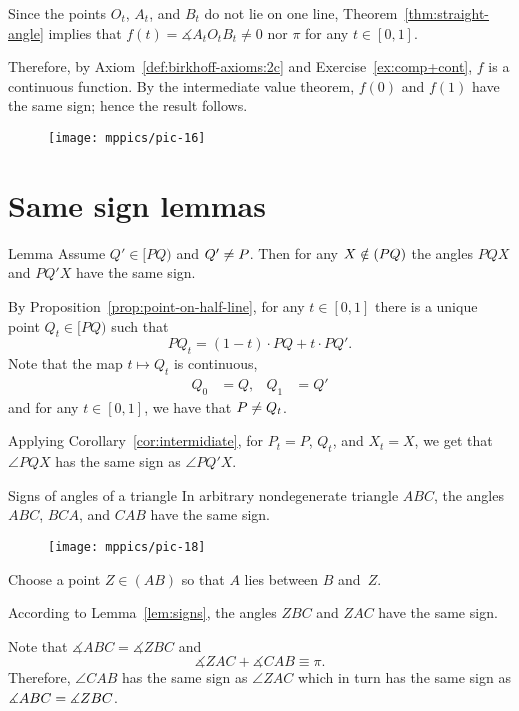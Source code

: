 Since 
the points $O_t$, $A_t$, and $B_t$ do not lie on one line,
Theorem~\ref{thm:straight-angle} implies that $f(t)=\measuredangle A_tO_tB_t\ne 0$ nor $\pi$ for any $t\in[0,1]$.

Therefore, by Axiom~\ref{def:birkhoff-axioms:2c} and Exercise~\ref{ex:comp+cont},
$f$ is a continuous function.
By the intermediate value theorem, $f(0)$ and $f(1)$ have the same sign;
hence the result follows.
\qeds

{

\begin{wrapfigure}{r}{33mm}
\centering
\texttt{[image: mppics/pic-16]}
\end{wrapfigure}

\section*{Same sign lemmas}

\begin{thm}[\abs]{Lemma}\label{lem:signs}
Assume $Q'\in [PQ)$ and $Q'\z\ne P$.
Then for any $X\z\notin (PQ)$ the angles $PQX$ and $PQ'X$ have the same sign. 
\end{thm}

By Proposition~\ref{prop:point-on-half-line},
for any $t\in [0,1]$ there is a unique point $Q_t\in[PQ)$ 
such that 
\[PQ_t=  (1-t)\cdot PQ+t\cdot PQ'.\]
Note that the map $t\mapsto Q_t$ is continuous,
\begin{align*}
Q_0&=Q,
&
Q_1&=Q'
\end{align*}
and for any $t\in [0,1]$, 
we have that $P\z\ne Q_t$.

}

Applying Corollary~\ref{cor:intermidiate},
for $P_t=P$, $Q_t$, and $X_t=X$, we get that $\angle PQX$ has the same sign as $\angle PQ'X$.
\qeds



\begin{thm}[\abs]{Signs of angles of a triangle}\label{thm:signs-of-triug}
In arbitrary nondegenerate triangle $ABC$,
the angles $ABC$, $BCA$, and $CAB$ have the same sign. 
\end{thm}

{

\begin{wrapfigure}{o}{33mm}
\vskip-4mm
\centering
\texttt{[image: mppics/pic-18]}
\end{wrapfigure}

Choose a point $Z\in (AB)$ so that $A$ lies between $B$ and~$Z$.


According to Lemma~\ref{lem:signs},
the angles $ZBC$ and $ZAC$ have the same sign.


Note that $\measuredangle ABC=\measuredangle ZBC$
and 
$$\measuredangle ZAC+\measuredangle CAB\equiv \pi.$$
Therefore, $\angle CAB$ has the same sign as $\angle ZAC$
which in turn has the same sign as $\measuredangle ABC\z=\measuredangle ZBC$.

}

